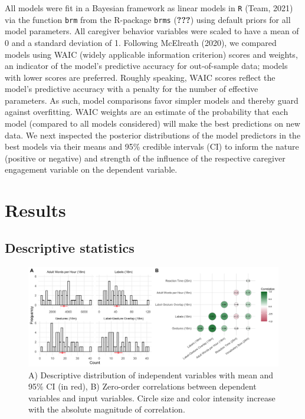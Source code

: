 \documentclass[
  english,
  man,floatsintext]{apa6}
\begin{document}
All models were fit in a Bayesian framework as linear models in \texttt{R} (Team, 2021) via the function \texttt{brm} from the R-package \texttt{brms} ({\textbf{???}}) using default priors for all model parameters. All caregiver behavior variables were scaled to have a mean of 0 and a standard deviation of 1. Following McElreath (2020), we compared models using WAIC (widely applicable information criterion) scores and weights, an indicator of the model's predictive accuracy for out-of-sample data; models with lower scores are preferred. Roughly speaking, WAIC scores reflect the model's predictive accuracy with a penalty for the number of effective parameters. As such, model comparisons favor simpler models and thereby guard against overfitting. WAIC weights are an estimate of the probability that each model (compared to all models considered) will make the best predictions on new data. We next inspected the posterior distributions of the model predictors in the best models via their means and 95\% credible intervals (CI) to inform the nature (positive or negative) and strength of the influence of the respective caregiver engagement variable on the dependent variable.

\hypertarget{results}{%
\section{Results}\label{results}}

\hypertarget{descriptive-statistics}{%
\subsection{Descriptive statistics}\label{descriptive-statistics}}

\begin{figure}
\includegraphics[width=1\linewidth]{../stats/figures/fig.1ab} \caption{A) Descriptive distribution of independent variables with mean and 95\% CI (in red), B) Zero-order correlations between dependent variables and input variables. Circle size and color intensity increase with the absolute magnitude of correlation.}\label{fig:fig2}
\end{figure}
\end{document}
